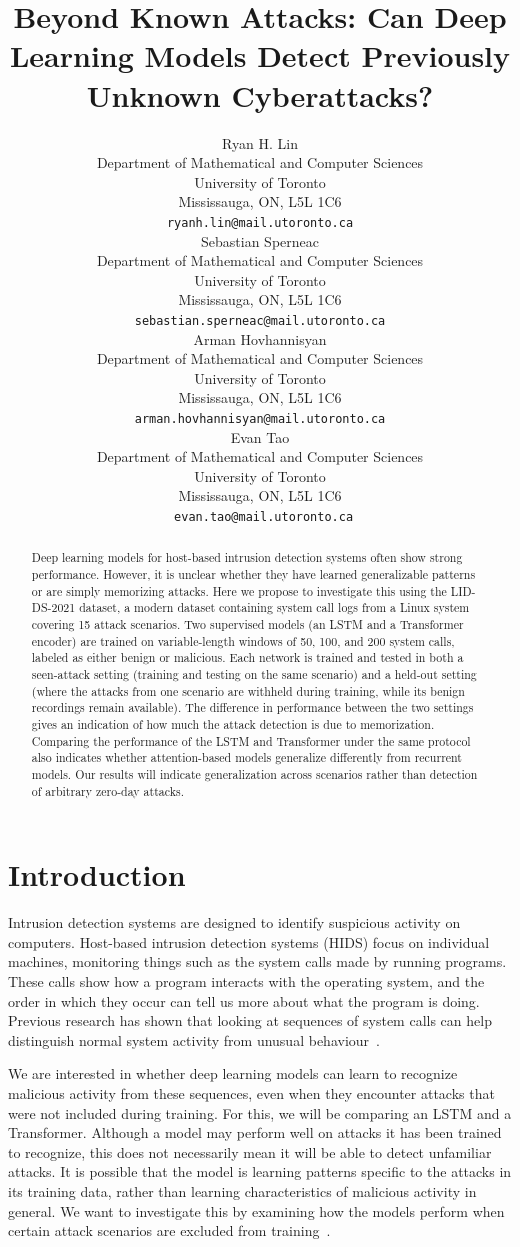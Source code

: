 \documentclass{article}
\title{Beyond Known Attacks: Can Deep Learning Models Detect Previously Unknown Cyberattacks?}
\author{%
 Ryan H. Lin \\
  Department of Mathematical and Computer Sciences\\
  University of Toronto\\
  Mississauga, ON, L5L 1C6 \\
  \texttt{ryanh.lin@mail.utoronto.ca} \\
  \And
 Sebastian Sperneac \\
  Department of Mathematical and Computer Sciences\\
  University of Toronto\\
  Mississauga, ON, L5L 1C6 \\
  \texttt{sebastian.sperneac@mail.utoronto.ca} \\
  \And
 Arman Hovhannisyan \\
  Department of Mathematical and Computer Sciences\\
  University of Toronto\\
  Mississauga, ON, L5L 1C6 \\
  \texttt{arman.hovhannisyan@mail.utoronto.ca} \\
  \And
  Evan Tao\\
    Department of Mathematical and Computer Sciences\\
    University of Toronto\\
    Mississauga, ON, L5L 1C6 \\
  \texttt{  evan.tao@mail.utoronto.ca} }
\begin{document}
\maketitle


\begin{abstract}
  Deep learning models for host-based intrusion detection systems often show strong performance. However, it is unclear whether they have learned generalizable patterns or are simply memorizing attacks. Here we propose to investigate this using the LID-DS-2021 dataset, a modern dataset containing system call logs from a Linux system covering 15 attack scenarios. Two supervised models (an LSTM and a Transformer encoder) are trained on variable-length windows of 50, 100, and 200 system calls, labeled as either benign or malicious. Each network is trained and tested in both a seen-attack setting (training and testing on the same scenario) and a held-out setting (where the attacks from one scenario are withheld during training, while its benign recordings remain available). The difference in performance between the two settings gives an indication of how much the attack detection is due to memorization. Comparing the performance of the LSTM and Transformer under the same protocol also indicates whether attention-based models generalize differently from recurrent models. Our results will indicate generalization across scenarios rather than detection of arbitrary zero-day attacks.
\end{abstract}


\section{Introduction}
\label{introduction}

Intrusion detection systems are designed to identify suspicious activity on computers. Host-based intrusion detection systems (HIDS) focus on individual machines, monitoring things such as the system calls made by running programs. These calls show how a program interacts with the operating system, and the order in which they occur can tell us more about what the program is doing. Previous research has shown that looking at sequences of system calls can help distinguish normal system activity from unusual behaviour~\citep{forrest1996unm,hofmeyr1998stide}.

We are interested in whether deep learning models can learn to recognize malicious activity from these sequences, even when they encounter attacks that were not included during training. For this, we will be comparing an LSTM and a Transformer. Although a model may perform well on attacks it has been trained to recognize, this does not necessarily mean it will be able to detect unfamiliar attacks. It is possible that the model is learning patterns specific to the attacks in its training data, rather than learning characteristics of malicious activity in general. We want to investigate this by examining how the models perform when certain attack scenarios are excluded from training~\citep{sommer2010outside,arp2022dos}.
\end{document}
